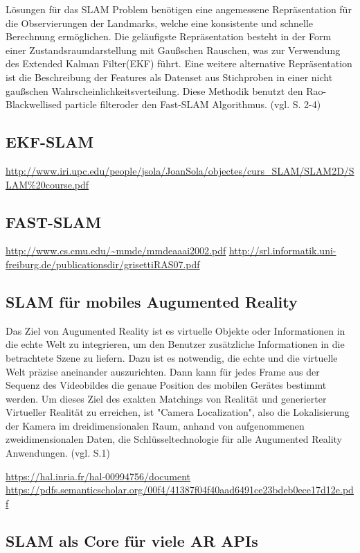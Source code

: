 Lösungen für das SLAM Problem benötigen eine angemessene Repräsentation für die Observierungen der Landmarks, welche eine konsistente und schnelle Berechnung ermöglichen. Die geläufigste Repräsentation besteht in der Form einer Zustandsraumdarstellung mit Gaußschen Rauschen, was zur Verwendung des \glqq Extended Kalman Filter\grqq (EKF) führt. Eine weitere alternative Repräsentation ist die Beschreibung der Features als Datenset aus Stichproben in einer nicht gaußschen Wahrscheinlichkeitsverteilung. Diese Methodik benutzt den \glqq Rao-Blackwellised particle filter\grqq oder den Fast-SLAM Algorithmus. (vgl. \cite{slam} S. 2-4)


\subsection{EKF-SLAM}

\url{http://www.iri.upc.edu/people/jsola/JoanSola/objectes/curs_SLAM/SLAM2D/SLAM%20course.pdf}

\subsection{FAST-SLAM}

\url{http://www.cs.cmu.edu/~mmde/mmdeaaai2002.pdf}
\url{http://srl.informatik.uni-freiburg.de/publicationsdir/grisettiRAS07.pdf}


\subsection{SLAM für mobiles Augumented Reality}

Das Ziel von Augumented Reality ist es virtuelle Objekte oder Informationen in die echte Welt zu integrieren, um den Benutzer zusätzliche Informationen in die betrachtete Szene zu liefern. Dazu ist es notwendig, die echte und die virtuelle Welt präzise aneinander auszurichten. Dann kann für jedes Frame aus der Sequenz des Videobildes die genaue Position des mobilen Gerätes bestimmt werden. Um dieses Ziel des exakten Matchings von Realität und generierter Virtueller Realität zu erreichen, ist "Camera Localization", also die Lokalisierung der Kamera im dreidimensionalen Raum, anhand von aufgenommenen zweidimensionalen Daten, die Schlüsseltechnologie für alle Augumented Reality Anwendungen. (vgl. \cite{slam_mobile} S.1)

\url{https://hal.inria.fr/hal-00994756/document}
\url{https://pdfs.semanticscholar.org/00f4/41387f04f40aad6491ce23bdeb0ece17d12e.pdf}



\subsection{SLAM als Core für viele AR APIs}